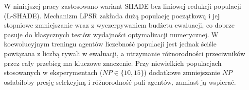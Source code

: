 W niniejszej pracy zastosowano wariant SHADE bez liniowej redukcji populacji (L-SHADE). Mechanizm LPSR zakłada dużą populację początkową i jej stopniowe zmniejszanie wraz z wyczerpywaniem budżetu ewaluacji, co dobrze pasuje do klasycznych testów wydajności optymalizacji numerycznej. W koewolucyjnym treningu agentów liczebność populacji jest jednak ściśle powiązana z liczbą rywali w ewaluacji, a utrzymanie różnorodności przeciwników przez cały przebieg ma kluczowe znaczenie. Przy niewielkich populacjach stosowanych w eksperymentach ($NP \in \{10, 15\}$) dodatkowe zmniejszanie $NP$ osłabiłoby presję selekcyjną i różnorodność puli agentów, zamiast ją wspierać.
